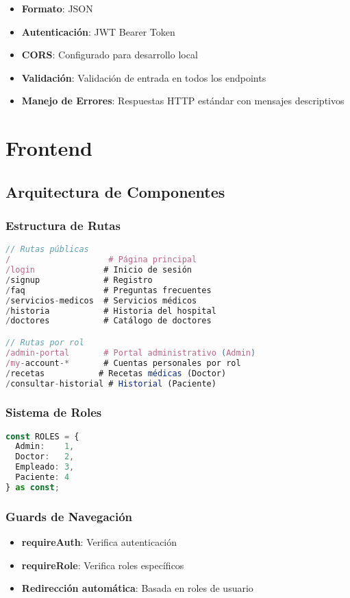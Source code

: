 \documentclass[12pt,a4paper]{article}
\begin{document}
\begin{itemize}
    \item \textbf{Formato}: JSON
    \item \textbf{Autenticación}: JWT Bearer Token
    \item \textbf{CORS}: Configurado para desarrollo local
    \item \textbf{Validación}: Validación de entrada en todos los endpoints
    \item \textbf{Manejo de Errores}: Respuestas HTTP estándar con mensajes descriptivos
\end{itemize}

\section{Frontend}

\subsection{Arquitectura de Componentes}

\subsubsection{Estructura de Rutas}
\begin{lstlisting}[language=typescript]
// Rutas públicas
/                    # Página principal
/login              # Inicio de sesión
/signup             # Registro
/faq                # Preguntas frecuentes
/servicios-medicos  # Servicios médicos
/historia           # Historia del hospital
/doctores           # Catálogo de doctores

// Rutas por rol
/admin-portal       # Portal administrativo (Admin)
/my-account-*       # Cuentas personales por rol
/recetas           # Recetas médicas (Doctor)
/consultar-historial # Historial (Paciente)
\end{lstlisting}

\subsubsection{Sistema de Roles}
\begin{lstlisting}[language=typescript]
const ROLES = {
  Admin:    1,
  Doctor:   2,
  Empleado: 3,
  Paciente: 4
} as const;
\end{lstlisting}

\subsubsection{Guards de Navegación}
\begin{itemize}
    \item \textbf{requireAuth}: Verifica autenticación
    \item \textbf{requireRole}: Verifica roles específicos
    \item \textbf{Redirección automática}: Basada en roles de usuario
\end{itemize}
\end{document}
